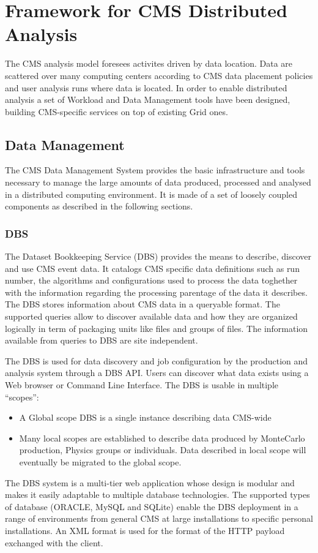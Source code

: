 \section{Framework for CMS Distributed Analysis}
\label{sec:3}
The CMS analysis model foresees activites driven by data location. Data are scattered over many computing centers according to CMS data placement policies and user analysis runs where data is located. In order to enable distributed analysis a set of Workload and Data Management tools have been designed, building CMS-specific services on top of existing Grid ones.

\subsection{Data Management}
\label{sec:3_1}
The CMS Data Management System provides the basic infrastructure and tools necessary to manage the large amounts of data produced, processed and analysed in a distributed computing environment. It is made of a set of loosely coupled components as described in the following sections.
\subsubsection{DBS}
\label{sec:3_1_1}
The Dataset Bookkeeping Service (DBS)\cite{RefDBS} provides the means to describe, discover and use CMS event data. 
It catalogs CMS specific data definitions such as run number, the algorithms and configurations used to process the data toghether with the information regarding the processing parentage of the data it describes.
The DBS stores information about CMS data in a queryable format. The supported queries allow to discover available data and how they are organized logically in term of packaging units like files and groups of files. The information available from queries to DBS are site independent.

The DBS is used for data discovery and job configuration by the production and analysis system through a DBS API.
Users can discover what data exists using a Web browser or Command Line Interface.
The DBS is usable in multiple “scopes”:
\begin{itemize}
\item A Global scope DBS is a single instance describing data CMS-wide %
\item Many local scopes are established to describe data produced by MonteCarlo production, Physics groups or individuals. Data described in local scope will eventually be migrated to the global scope. 
\end{itemize}
The DBS system is a multi-tier web application whose design is modular and makes it easily adaptable to multiple database technologies. The supported types of database (ORACLE, MySQL and SQLite) enable the DBS deployment in a range of environments from general CMS at large installations to specific personal installations.
An XML format is used for the format of the HTTP payload exchanged with the client.

